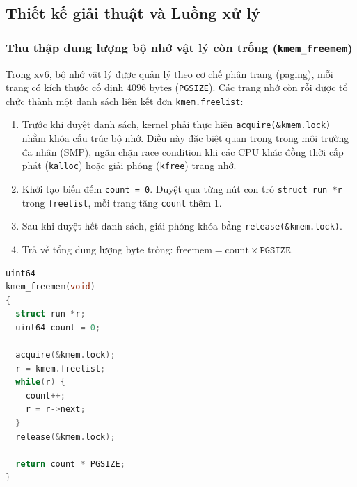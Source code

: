 \subsection{Thiết kế giải thuật và Luồng xử lý}

\subsubsection{Thu thập dung lượng bộ nhớ vật lý còn trống (\texttt{kmem\_freemem})}
Trong xv6, bộ nhớ vật lý được quản lý theo cơ chế phân trang (paging), mỗi trang có kích thước cố định $4096\text{ bytes}$ (\texttt{PGSIZE}). Các trang nhớ còn rỗi được tổ chức thành một danh sách liên kết đơn \texttt{kmem.freelist}:
\begin{enumerate}
    \item Trước khi duyệt danh sách, kernel phải thực hiện \texttt{acquire(\&kmem.lock)} nhằm khóa cấu trúc bộ nhớ. Điều này đặc biệt quan trọng trong môi trường đa nhân (SMP), ngăn chặn race condition khi các CPU khác đồng thời cấp phát (\texttt{kalloc}) hoặc giải phóng (\texttt{kfree}) trang nhớ.
    \item Khởi tạo biến đếm \texttt{count = 0}. Duyệt qua từng nút con trỏ \texttt{struct run *r} trong \texttt{freelist}, mỗi trang tăng \texttt{count} thêm 1.
    \item Sau khi duyệt hết danh sách, giải phóng khóa bằng \texttt{release(\&kmem.lock)}.
    \item Trả về tổng dung lượng byte trống: $\text{freemem} = \text{count} \times \texttt{PGSIZE}$.
\end{enumerate}

\begin{lstlisting}[language=C, caption={Cài đặt hàm tính bộ nhớ trống trong kernel/kalloc.c}]
uint64
kmem_freemem(void)
{
  struct run *r;
  uint64 count = 0;

  acquire(&kmem.lock);
  r = kmem.freelist;
  while(r) {
    count++;
    r = r->next;
  }
  release(&kmem.lock);

  return count * PGSIZE;
}
\end{lstlisting}


